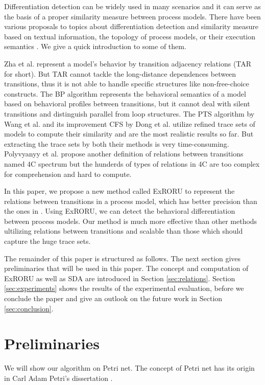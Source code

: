\documentclass[dvips,...]{llncs}
\begin{document}
Differentiation detection can be widely used in many scenarios and it can serve as the basis of a proper similarity measure between process models. There have been various proposals to topics about differentiation detection and similarity measure based on textual information, the topology of process models, or their execution semantics \cite{weidlich2011efficient}. We give a quick introduction to some of them.

Zha et al. \cite{zha2010workflow} represent a model's behavior by transition adjacency relations (TAR for short). But TAR cannot tackle the long-distance dependences between transitions, thus it is not able to handle specific structures like non-free-choice constructs. The BP algorithm \cite{weidlich2011efficient} represents the behavioral semantics of a model based on behavioral profiles between transitions, but it cannot deal with silent transitions and distinguish parallel from loop structures. The PTS algorithm by Wang et al. \cite{wang2010behavioral} and its improvement CFS by Dong et al. \cite{dong2014cfs} utilize refined trace sets of models to compute their similarity and are the most realistic results so far. But extracting the trace sets by both their methods is very time-consuming. Polyvyanyy et al. \cite{polyvyanyy20144c} propose another definition of relations between transitions named 4C spectrum but the hunderds of types of relations in 4C are too complex for comprehension and hard to compute. %

In this paper, we propose a new method called ExRORU to represent the relations between transitions in a process model, which has better precision than the ones in \cite{jin2014computing}. Using ExRORU, we can detect the behavioral differentiation between process models. Our method is much more effective than other methods ultilizing relations between transitions and scalable than those which should capture the huge trace sets.

The remainder of this paper is structured as follows. The next section gives preliminaries that will be used in this paper. The concept and computation of ExRORU as well as SDA are introduced in Section \ref{sec:relations}. Section \ref{sec:experiments} shows the results of the experimental evaluation, before we conclude the paper and give an outlook on the future work in Section \ref{sec:conclusion}.

\section{Preliminaries}\label{sec:preliminaries}
We will show our algorithm on Petri net. The concept of Petri net has its origin in Carl Adam Petri's dissertation \cite{petri1966kommunikation}.
\end{document}
